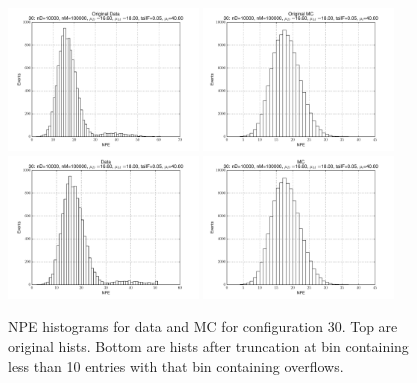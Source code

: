  \begin{figure}[htbp] \begin{center} 
\includegraphics[width=0.45\textwidth]{../FIGURES/30/FIG_Original_Data.pdf} 
\includegraphics[width=0.45\textwidth]{../FIGURES/30/FIG_Original_MC.pdf} 
\includegraphics[width=0.45\textwidth]{../FIGURES/30/FIG_Data.pdf} 
\includegraphics[width=0.45\textwidth]{../FIGURES/30/FIG_MC.pdf} 
\caption{NPE histograms for data and MC for configuration 30. Top are original hists. Bottom are hists after truncation at bin containing less than 10 entries with that bin containing overflows.} 
\label{tab:npe_30} 
\end{center} \end{figure} 

